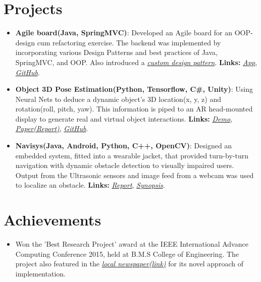 \documentclass[letterpaper,11pt]{article}
\newcommand{\resumeItem}[2]{
  \item\small{
    \textbf{#1}{: #2 \vspace{-2pt}}
  }
}
\newcommand{\resumePoint}[1]{
  \item\small{#1}
}
\newcommand{\resumeSubItem}[2]{\resumeItem{#1}{#2}\vspace{-4pt}}
\newcommand{\resumeSubHeadingListStart}{\begin{itemize}[leftmargin=*]}
\newcommand{\resumeSubHeadingListEnd}{\end{itemize}\vspace{-10pt}}
\begin{document}
%

\section{Projects}
  \resumeSubHeadingListStart
    \resumeSubItem{Agile board(Java, SpringMVC)}
      {Developed an Agile board for an OOP-design cum refactoring exercise. The backend was implemented by incorporating various Design Patterns and best practices of Java, SpringMVC, and OOP. Also introduced a \href{https://github.com/nikhilsu/Agile-board/blob/master/src/main/java/com/prorg/helper/result/Response.java}{\emph{custom design pattern}}. \textbf{Links:}
      \href{https://prorg.herokuapp.com}{\textit{App}}, \href{https://github.com/nikhilsu/Agile-board}{\textit{GitHub}}.}
    \resumeSubItem{Object 3D Pose Estimation(Python, Tensorflow, C\#, Unity)}
      {Using Neural Nets to deduce a dynamic object\rq s 3D location(x, y, z) and rotation(roll, pitch, yaw). This information is piped to an AR head-mounted display to generate real and virtual object interactions. \textbf{Links:}
      \href{https://drive.google.com/file/d/1kCepKQxR73tUTLuvmd1YL3sIbj1GxDdc/view?usp=sharing}{\textit{Demo}}, \href{https://drive.google.com/file/d/1mRwSJ8p2-g-gtBGl1A8seRB8SojWQphm/view?usp=sharing}{\textit{Paper(Report)}}, \href{https://github.com/nikhilsu/Object-location-detection}{\textit{GitHub}}.}
    \resumeSubItem{Navisys(Java, Android, Python, C++, OpenCV)}
      {Designed an embedded system, fitted into a wearable jacket, that provided turn-by-turn navigation with dynamic obstacle detection to visually impaired users.  Output from the Ultrasonic sensors and image feed from a webcam was used to localize an obstacle. \textbf{Links:}
      \href{https://drive.google.com/file/d/1bFHeZ7-7uwZ0spir3YQ7r0maWdLteEtu/view?usp=sharing}{\textit{Report}},
      \href{https://drive.google.com/file/d/1JWB67U2jjTG7cXZFVjRPVGKsv-rRhgUQ/view?usp=sharing}{\textit{Synopsis}}.}
    \resumeSubHeadingListEnd

\section{Achievements}
  \resumeSubHeadingListStart
    \resumePoint{Won the 'Best Research Project' award at the IEEE International Advance Computing Conference 2015, held at B.M.S College of Engineering. The project also featured in the \href{https://drive.google.com/open?id=0B0vNhKZyi8qyam1fQ3lfaE1hMkE}{\emph{local newspaper(link)}} for its novel approach of implementation.}
  \resumeSubHeadingListEnd
\end{document}
